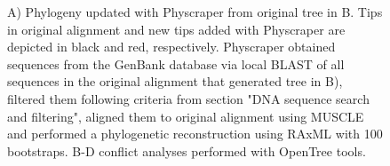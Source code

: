 \documentclass{bmcart}
\begin{document}
\begin{backmatter}
\begin{figure}[h!]
  \caption{A) Phylogeny updated with Physcraper from original
  \cite{gottlieb2005molecular} tree in B.
  Tips in original alignment and new tips added with Physcraper are depicted in
  black and red, respectively. Physcraper obtained sequences from the GenBank
  database via local BLAST of all sequences in the original alignment that generated
  tree in B), filtered them following criteria from section "DNA sequence search and
  filtering", aligned them to original alignment using MUSCLE and performed a
  phylogenetic reconstruction using RAxML with 100 bootstraps. B-D conflict analyses
  performed with OpenTree tools.}
\end{figure}


\end{backmatter}
\end{document}
